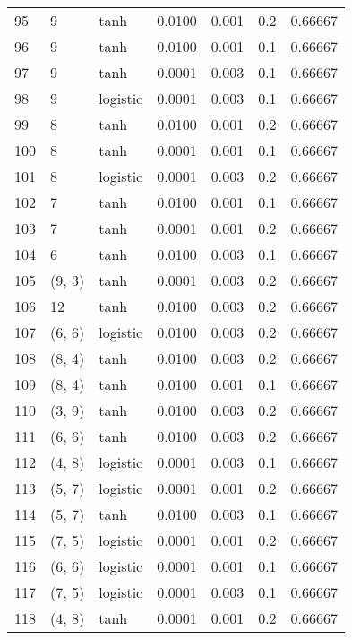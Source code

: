 \begin{tabular}{lllrrrr}
95  &           9 &      tanh &  0.0100 &  0.001 &  0.2 &   0.66667 \\
96  &           9 &      tanh &  0.0100 &  0.001 &  0.1 &   0.66667 \\
97  &           9 &      tanh &  0.0001 &  0.003 &  0.1 &   0.66667 \\
98  &           9 &  logistic &  0.0001 &  0.003 &  0.1 &   0.66667 \\
99  &           8 &      tanh &  0.0100 &  0.001 &  0.2 &   0.66667 \\
100 &           8 &      tanh &  0.0001 &  0.001 &  0.1 &   0.66667 \\
101 &           8 &  logistic &  0.0001 &  0.003 &  0.2 &   0.66667 \\
102 &           7 &      tanh &  0.0100 &  0.001 &  0.1 &   0.66667 \\
103 &           7 &      tanh &  0.0001 &  0.001 &  0.2 &   0.66667 \\
104 &           6 &      tanh &  0.0100 &  0.003 &  0.1 &   0.66667 \\
105 &      (9, 3) &      tanh &  0.0001 &  0.003 &  0.2 &   0.66667 \\
106 &          12 &      tanh &  0.0100 &  0.003 &  0.2 &   0.66667 \\
107 &      (6, 6) &  logistic &  0.0100 &  0.003 &  0.2 &   0.66667 \\
108 &      (8, 4) &      tanh &  0.0100 &  0.003 &  0.2 &   0.66667 \\
109 &      (8, 4) &      tanh &  0.0100 &  0.001 &  0.1 &   0.66667 \\
110 &      (3, 9) &      tanh &  0.0100 &  0.003 &  0.2 &   0.66667 \\
111 &      (6, 6) &      tanh &  0.0100 &  0.003 &  0.2 &   0.66667 \\
112 &      (4, 8) &  logistic &  0.0001 &  0.003 &  0.1 &   0.66667 \\
113 &      (5, 7) &  logistic &  0.0001 &  0.001 &  0.2 &   0.66667 \\
114 &      (5, 7) &      tanh &  0.0100 &  0.003 &  0.1 &   0.66667 \\
115 &      (7, 5) &  logistic &  0.0001 &  0.001 &  0.2 &   0.66667 \\
116 &      (6, 6) &  logistic &  0.0001 &  0.001 &  0.1 &   0.66667 \\
117 &      (7, 5) &  logistic &  0.0001 &  0.003 &  0.1 &   0.66667 \\
118 &      (4, 8) &      tanh &  0.0001 &  0.001 &  0.2 &   0.66667 \\

\end{tabular}
